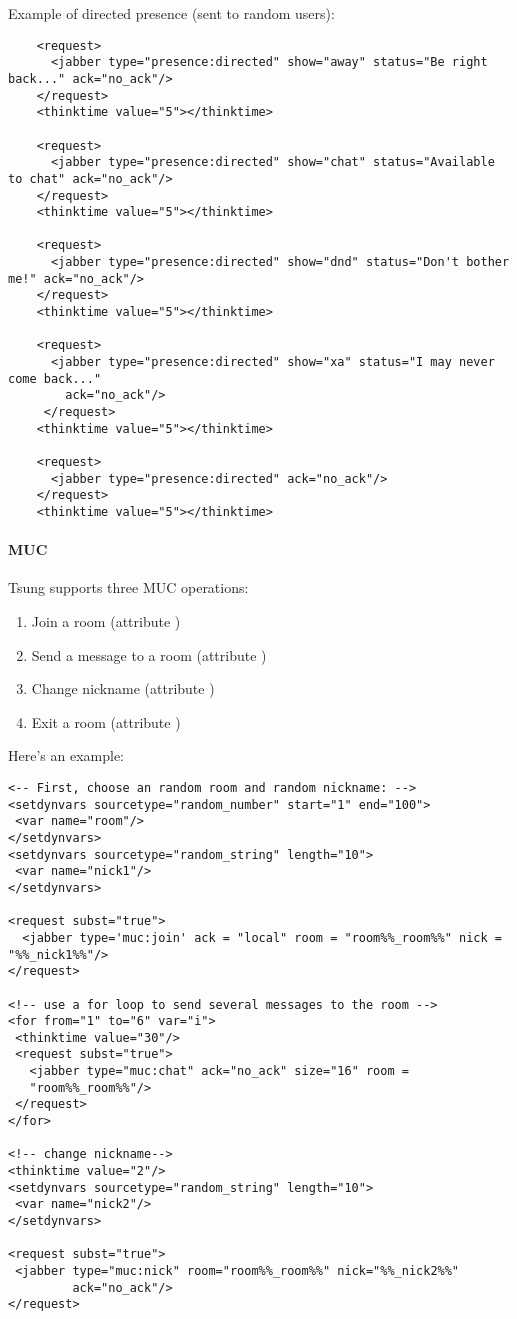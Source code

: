 \documentclass{TSUNG-en}
\begin{document}
Example of directed presence (sent to random  users):
\begin{Verbatim}
    <request>
      <jabber type="presence:directed" show="away" status="Be right back..." ack="no_ack"/>
    </request>
    <thinktime value="5"></thinktime>

    <request>
      <jabber type="presence:directed" show="chat" status="Available to chat" ack="no_ack"/>
    </request>
    <thinktime value="5"></thinktime>

    <request>
      <jabber type="presence:directed" show="dnd" status="Don't bother me!" ack="no_ack"/>
    </request>
    <thinktime value="5"></thinktime>

    <request>
      <jabber type="presence:directed" show="xa" status="I may never come back..."
        ack="no_ack"/>
     </request>
    <thinktime value="5"></thinktime>

    <request>
      <jabber type="presence:directed" ack="no_ack"/>
    </request>
    <thinktime value="5"></thinktime>
\end{Verbatim}

\paragraph{MUC}


Tsung supports three MUC operations:
\begin{enumerate}
\item Join a room (attribute )
\item Send a message to a room (attribute )
\item Change nickname (attribute )
\item Exit a room (attribute )
\end{enumerate}

Here's an example:
\begin{Verbatim}
<-- First, choose an random room and random nickname: -->
<setdynvars sourcetype="random_number" start="1" end="100">
 <var name="room"/>
</setdynvars>
<setdynvars sourcetype="random_string" length="10">
 <var name="nick1"/>
</setdynvars>

<request subst="true">
  <jabber type='muc:join' ack = "local" room = "room%%_room%%" nick = "%%_nick1%%"/>
</request>

<!-- use a for loop to send several messages to the room -->
<for from="1" to="6" var="i">
 <thinktime value="30"/>
 <request subst="true">
   <jabber type="muc:chat" ack="no_ack" size="16" room =
   "room%%_room%%"/>
 </request>
</for>

<!-- change nickname-->
<thinktime value="2"/>
<setdynvars sourcetype="random_string" length="10">
 <var name="nick2"/>
</setdynvars>

<request subst="true">
 <jabber type="muc:nick" room="room%%_room%%" nick="%%_nick2%%"
         ack="no_ack"/>
</request>
\end{Verbatim}
\end{document}
